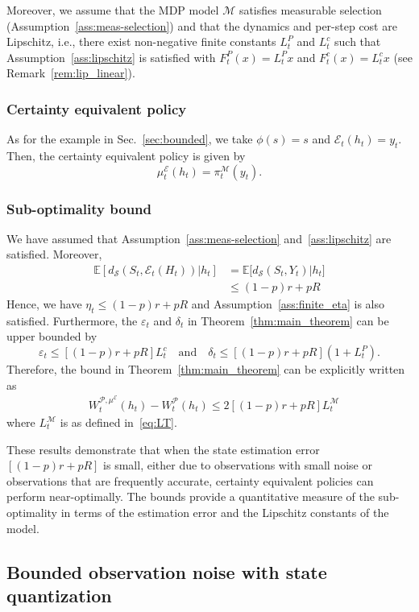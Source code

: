 \documentclass[letterpaper, 10pt]{IEEEtran}
\theoremstyle{plain}
\theoremstyle{nonumberplain}
\theoremstyle{plain}
\newcommand*\ALPHABET{\mathcal}
\newcommand*\EXP{\mathds{E}}
\newcommand\dS{d_{\ALPHABET S}}
\newcommand\EST{\mathcal{E}}
\begin{document}
Moreover, we assume that the MDP model $\ALPHABET M$ satisfies measurable selection (Assumption~\ref{ass:meas-selection}) and  that the dynamics and per-step cost are Lipschitz, i.e., there exist non-negative finite constants $L_t^P$ and $L_t^c$ such that Assumption~\ref{ass:lipschitz} is satisfied with $F_t^P(x)=L_t^P x$ and $F_t^c (x) = L_t^c x$ (see Remark~\ref{rem:lip_linear}).

\subsubsection{Certainty equivalent policy}
As for the example in Sec.~\ref{sec:bounded}, we take $\phi(s) = s$ and $\EST_t(h_t) = y_t$. Then, the certainty equivalent policy is given by
\[
    \mu_t^{\EST}(h_t) = \pi^{\ALPHABET M}_t(y_t).
\]

\subsubsection{Sub-optimality bound}
We have assumed that Assumption~\ref{ass:meas-selection} and~\ref{ass:lipschitz} are satisfied. Moreover,
\begin{align}
    \EXP[ \dS(S_t, \EST_t(H_t)) | h_t ]  &= \EXP\bigl[d_{\ALPHABET{S}}(S_t,Y_t)| h_t\bigr] \nonumber \\
    &\le (1-p) r + p R
\end{align}
Hence, we have $\eta_t \leq (1-p)r + pR$ and Assumption~\ref{ass:finite_eta} is also satisfied. Furthermore, the $\varepsilon_t$ and $\delta_t$ in Theorem~\ref{thm:main_theorem} can be upper bounded by
\[
    \varepsilon_t \le [ (1-p)r + p R ] L_t^c \quad\text{and}\quad \delta_t \le [(1-p) r + p R ] (1 + L_t^P).
\]
Therefore, the bound in Theorem~\ref{thm:main_theorem} can be explicitly written as 
\begin{align}
    &W^{\ALPHABET P,\mu^\EST}_t(h_t) - W^{\ALPHABET P}_t(h_t)
    \leq 2[(1-p) r + p R ] L_t^{\ALPHABET M}
\end{align}
where $L^{\ALPHABET M}_t$ is as defined in~\eqref{eq:LT}.

These results demonstrate that when the state estimation error $[(1-p) r + p R ]$ is small, either due to observations with small noise or observations that are frequently accurate, certainty equivalent policies can perform near-optimally. The bounds provide a quantitative measure of the sub-optimality in terms of the estimation error and the Lipschitz constants of the model.


\subsection{Bounded observation noise with state quantization}
\end{document}
